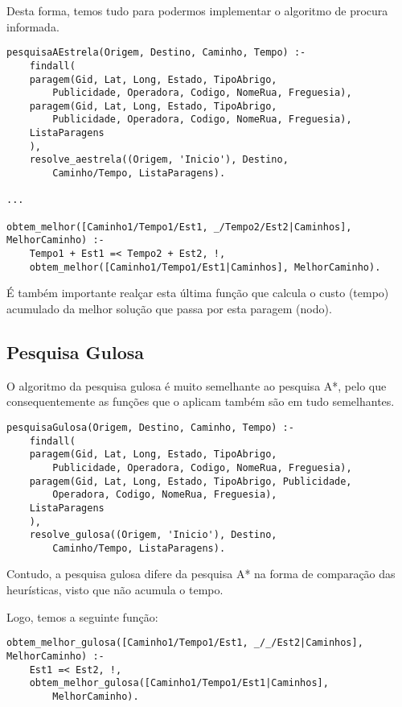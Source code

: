 \documentclass[a4paper,12pt]{report}
\begin{document}
\par Desta forma, temos tudo para podermos implementar o algoritmo de procura informada.

\begin{verbatim}
pesquisaAEstrela(Origem, Destino, Caminho, Tempo) :-            
    findall(
    paragem(Gid, Lat, Long, Estado, TipoAbrigo, 
        Publicidade, Operadora, Codigo, NomeRua, Freguesia),
    paragem(Gid, Lat, Long, Estado, TipoAbrigo, 
        Publicidade, Operadora, Codigo, NomeRua, Freguesia),
    ListaParagens
    ),
    resolve_aestrela((Origem, 'Inicio'), Destino,
        Caminho/Tempo, ListaParagens).
        
...

obtem_melhor([Caminho1/Tempo1/Est1, _/Tempo2/Est2|Caminhos],
MelhorCaminho) :-
	Tempo1 + Est1 =< Tempo2 + Est2, !,
	obtem_melhor([Caminho1/Tempo1/Est1|Caminhos], MelhorCaminho).
\end{verbatim}

É também importante realçar esta última função que calcula o custo (tempo) acumulado da melhor solução que passa por esta paragem (nodo).


\vspace{0.7cm}

\subsection{Pesquisa Gulosa}

O algoritmo da pesquisa gulosa é muito semelhante ao pesquisa A*, pelo que consequentemente as funções que o aplicam também são em tudo semelhantes.

\begin{verbatim}
pesquisaGulosa(Origem, Destino, Caminho, Tempo) :-            
    findall(
    paragem(Gid, Lat, Long, Estado, TipoAbrigo,
        Publicidade, Operadora, Codigo, NomeRua, Freguesia),
    paragem(Gid, Lat, Long, Estado, TipoAbrigo, Publicidade,
        Operadora, Codigo, NomeRua, Freguesia),
    ListaParagens
    ),
    resolve_gulosa((Origem, 'Inicio'), Destino,
        Caminho/Tempo, ListaParagens).   
\end{verbatim}

\par Contudo, a pesquisa gulosa difere da pesquisa A* na forma de comparação das heurísticas, visto que não acumula o tempo.
\par Logo, temos a seguinte função:

\begin{verbatim}
obtem_melhor_gulosa([Caminho1/Tempo1/Est1, _/_/Est2|Caminhos],
MelhorCaminho) :-
	Est1 =< Est2, !,
	obtem_melhor_gulosa([Caminho1/Tempo1/Est1|Caminhos],
	    MelhorCaminho).
\end{verbatim}
\end{document}
